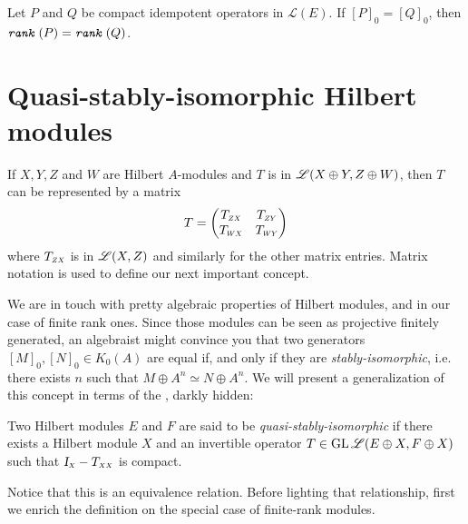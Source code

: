 \begin{corolario}
    \label{corol: [P]_0 =[Q]_0 ---> rank(P) = rank(Q)}
    Let $P$ and $Q$ be compact idempotent operators in $\mathscr L(E)$. If $[P]_0 = [Q]_0$, then $\texttt{\textit{rank}}\,(P) = \texttt{\textit{rank}}\,(Q)$.
\end{corolario}


\section{Quasi-stably-isomorphic Hilbert modules}

If $X, Y, Z$ and $W$ are Hilbert $A$-modules and $T$ is in $\mathscr L(X \oplus Y, Z \oplus W)$, then $T$ can be represented by a matrix
$$
T=\begin{pmatrix}
\sub{T}{Z X} & \sub{T}{Z Y} \\
\sub{T}{W X} & \sub{T}{W Y}
\end{pmatrix}
$$
where $\sub{T}{Z X}$ is in $\mathscr L(X, Z)$ and similarly for the other matrix entries. Matrix notation is used to define our next important concept.

We are in touch with pretty algebraic properties of Hilbert modules, and in our case of finite rank ones. Since those modules can be seen as projective finitely generated, an algebraist might convince you that two generators $[M]_0,[N]_0 \in K_0(A)$ are equal if, and only if they are \textit{stably-isomorphic}, i.e. there exists $n$ such that $ M \oplus A^n \simeq N \oplus A^n$. We will present a generalization of this concept in terms of the \rank, darkly hidden:

\begin{definicao}
\label{def: quasi-stabli-isomorphic}
Two Hilbert modules $E$ and $F$ are said to be \textit{quasi-stably-isomorphic} if there exists a Hilbert module $X$ and an invertible operator $T \in \operatorname{GL} \mathscr L(E \oplus X, F \oplus X)$ such that $\sub{\Id}{X}-\sub T{X X}$ is compact.
\end{definicao}

Notice that this is an equivalence relation. Before lighting that relationship, first we enrich the definition on the special case of finite-rank modules.

